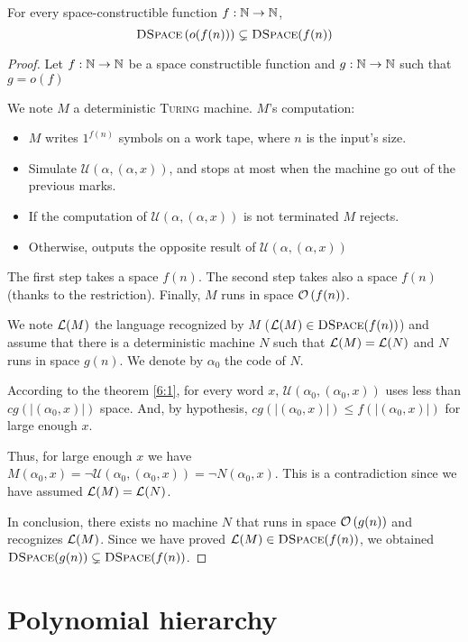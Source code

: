 \begin{thm}
    For every space-constructible function $f:\mathbb{N} \to \mathbb{N}$,    
    $$
        \textsc{DSpace}\left(o(f(n))\right) \subsetneq \textsc{DSpace}(f(n))
    $$
\end{thm}
\begin{proof}
Let $f:\mathbb{N}\to\mathbb{N}$ be a space constructible function and $g:\mathbb{N}\to\mathbb{N}$ such that $g=o(f)$

We note $M$ a deterministic \textsc{Turing} machine. $M$'s computation:
\begin{itemize}
    \item $M$ writes $1^{f(n)}$ symbols on a work tape, where $n$ is the input's size.
    \item Simulate $\mathcal{U}(\alpha,(\alpha,x))$, and stops at most when the machine go out of the previous marks.
    \item If the computation of $\mathcal{U}(\alpha,(\alpha,x))$ is not terminated $M$ rejects.
    \item Otherwise, outputs the opposite result of $\mathcal{U}(\alpha,(\alpha,x))$
\end{itemize}

    The first step takes a space $f(n)$. The second step takes also a space $f(n)$ (thanks to the restriction). Finally, $M$ runs in space $\mathcal O \left( f(n) \right)$.

    We note $\mathcal{L}(M)$ the language recognized by $M$ ($\mathcal{L}(M)\in\textsc{DSpace}(f(n))$) and assume that there is a deterministic machine $N$ such that $\mathcal{L}(M)= \mathcal{L}(N)$ and $N$ runs in space $g(n)$. We denote by $\alpha_0$ the code of $N$.

    According to the theorem \ref{6:1}, for every word $x$, $\mathcal{U}(\alpha_0,(\alpha_0,x))$ uses less than $c g(|(\alpha_0,x)|)$ space. And, by hypothesis, $c g(|(\alpha_0,x)|) \leqslant f(|(\alpha_0,x)|)$ for large enough $x$.

    Thus, for large enough $x$ we have $M(\alpha_0,x) = \neg\mathcal{U}(\alpha_0,(\alpha_0,x)) = \neg N(\alpha_0,x)$. This is a contradiction since we have assumed $\mathcal{L}(M)= \mathcal{L}(N)$.
  
  In conclusion, there exists no machine $N$ that runs in space $\mathcal O \left( g(n) \right)$ and recognizes $\mathcal{L}(M)$. Since we have proved $\mathcal{L}(M) \in \textsc{DSpace}(f(n))$, we obtained $\textsc{DSpace} (g(n)) \subsetneq \textsc{DSpace}(f(n))$.
\end{proof}


\section{Polynomial hierarchy}

